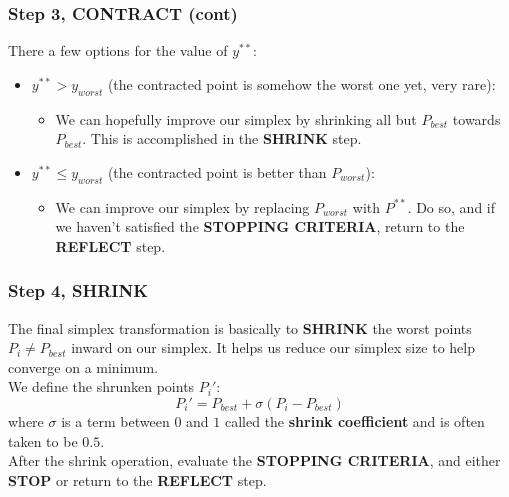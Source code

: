 \documentclass[aspectratio=169]{beamer}
\begin{document}
	\begin{frame}
		\frametitle{Step 3, CONTRACT (cont)}
		There a few options for the value of $y^{**}$:\\[\baselineskip]
		\begin{itemize}
			\item $y^{**} > y_{worst}$ (the contracted point is somehow the worst one yet, very rare):
			\begin{itemize}
				\item We can hopefully improve our simplex by shrinking all but $P_{best}$ towards $P_{best}$. This is accomplished in the \textbf{SHRINK} step.
			\end{itemize}
		\end{itemize}
		\begin{itemize}
			\item $y^{**} \leq y_{worst}$ (the contracted point is better than $P_{worst}$):
			\begin{itemize}
				\item We can improve our simplex by replacing $P_{worst}$ with $P^{**}$. Do so, and if we haven't satisfied the \textbf{STOPPING CRITERIA}, return to the \textbf{REFLECT} step.
			\end{itemize}
		\end{itemize}
	\end{frame}

	\begin{frame}
		\frametitle{Step 4, SHRINK}
		The final simplex transformation is basically to \textbf{SHRINK} the worst points $P_i \neq P_{best}$ inward on our simplex. It helps us reduce our simplex size to help converge on a minimum.
		\\[\baselineskip]
		We define the shrunken points $P_i'$:
		$$P_i'=P_{best}+\sigma(P_i-P_{best})$$
		where $\sigma$ is a term between $0$ and $1$ called the \textbf{shrink coefficient} and is often taken to be $0.5$.
		\\[\baselineskip]
		After the shrink operation, evaluate the \textbf{STOPPING CRITERIA}, and either \textbf{STOP} or return to the \textbf{REFLECT} step.
	\end{frame}
\end{document}
